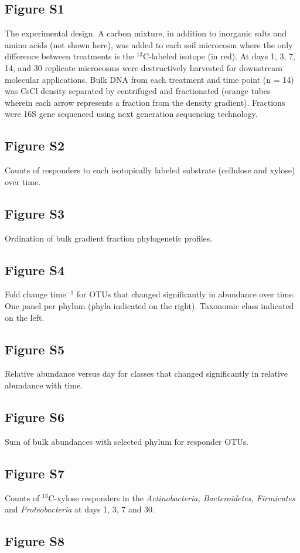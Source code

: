 \subsection{Figure S1}
The experimental design.  A carbon mixture, in addition to inorganic salts and amino acids (not shown here), was added to each soil microcosm where the only difference between treatments is the $^{13}$C-labeled isotope (in red). At days 1, 3, 7, 14, and 30 replicate microcosms were destructively harvested for downstream molecular applications. Bulk DNA from each treatment and time point (n = 14) was CsCl density separated by centrifuged and fractionated (orange tubes wherein each arrow represents a fraction from the density gradient). Fractions were 16S gene sequenced using next generation sequencing technology.\subsection{Figure S2}
Counts of responders to each isotopically labeled substrate (cellulose and xylose) over time.\subsection{Figure S3}
Ordination of bulk gradient fraction phylogenetic profiles.\subsection{Figure S4}
Fold change time$^{-1}$ for OTUs that changed significantly in abundance over time. One panel per phylum (phyla indicated on the right). Taxonomic class indicated on the left.\subsection{Figure S5}
Relative abundance versus day for classes that changed significantly in relative abundance with time.\subsection{Figure S6}
Sum of bulk abundances with selected phylum for responder OTUs.\subsection{Figure S7}
Counts of $^{13}$C-xylose responders in the \textit{Actinobacteria, Bacteroidetes, Firmicutes} and \textit{Proteobacteria} at days 1, 3, 7 and 30.\subsection{Figure S8}
